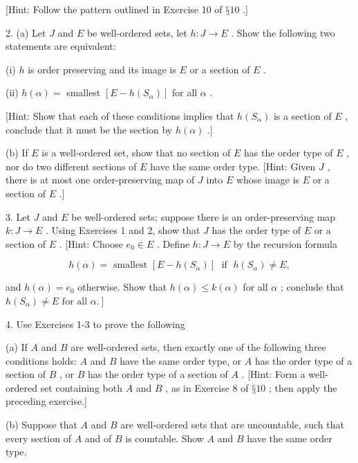 [Hint: Follow the pattern outlined in Exercise 10 of \(§{10}\) .]

2. (a) Let \(J\) and \(E\) be well-ordered sets, let \(h : J \rightarrow  E\) . Show the following two statements are equivalent:

(i) \(h\) is order preserving and its image is \(E\) or a section of \(E\) .

(ii) \(h\left( \alpha \right)  =\) smallest \(\left\lbrack  {E - h\left( {S}_{\alpha }\right) }\right\rbrack\) for all \(\alpha\) .

[Hint: Show that each of these conditions implies that \(h\left( {S}_{\alpha }\right)\) is a section of \(E\) , conclude that it must be the section by \(h\left( \alpha \right)\) .]

(b) If \(E\) is a well-ordered set, show that no section of \(E\) has the order type of \(E\) , nor do two different sections of \(E\) have the same order type. [Hint: Given \(J\) , there is at most one order-preserving map of \(J\) into \(E\) whose image is \(E\) or a section of \(E\) .]

3. Let \(J\) and \(E\) be well-ordered sets; suppose there is an order-preserving map \(k : J \rightarrow  E\) . Using Exercises 1 and 2, show that \(J\) has the order type of \(E\) or a section of \(E\) . [Hint: Choose \({e}_{0} \in  E\) . Define \(h : J \rightarrow  E\) by the recursion formula

\[
h\left( \alpha \right)  = \text{ smallest }\left\lbrack  {E - h\left( {S}_{\alpha }\right) }\right\rbrack  \;\text{ if }\;h\left( {S}_{\alpha }\right)  \neq  E,
\]

and \(h\left( \alpha \right)  = {e}_{0}\) otherwise. Show that \(h\left( \alpha \right)  \leq  k\left( \alpha \right)\) for all \(\alpha\) ; conclude that \(\left. {h\left( {S}_{\alpha }\right)  \neq  E\text{ for all }\alpha .}\right\rbrack\)

4. Use Exercises 1-3 to prove the following

(a) If \(A\) and \(B\) are well-ordered sets, then exactly one of the following three conditions holds: \(A\) and \(B\) have the same order type, or \(A\) has the order type of a section of \(B\) , or \(B\) has the order type of a section of \(A\) . [Hint: Form a well-ordered set containing both \(A\) and \(B\) , as in Exercise 8 of \(§{10}\) ; then apply the preceding exercise.]

(b) Suppose that \(A\) and \(B\) are well-ordered sets that are uncountable, such that every section of \(A\) and of \(B\) is countable. Show \(A\) and \(B\) have the same order type.

